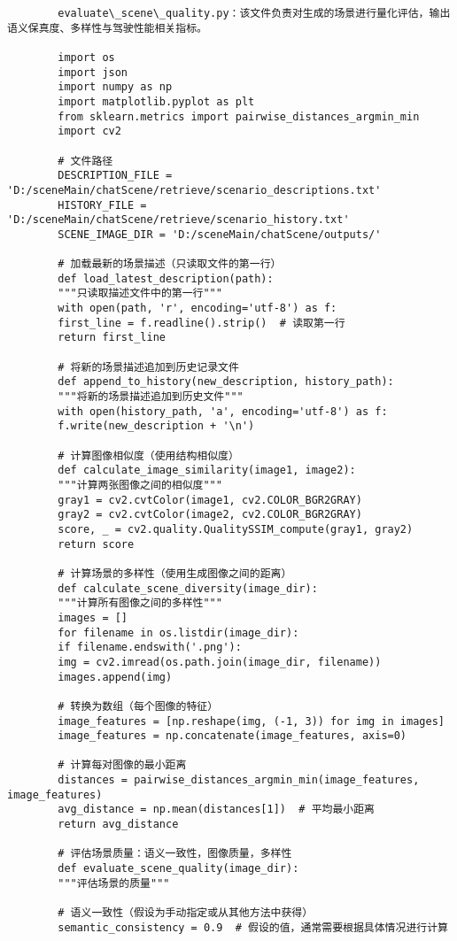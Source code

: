 	
\begin{lstlisting}
		evaluate\_scene\_quality.py：该文件负责对生成的场景进行量化评估，输出语义保真度、多样性与驾驶性能相关指标。

		import os
		import json
		import numpy as np
		import matplotlib.pyplot as plt
		from sklearn.metrics import pairwise_distances_argmin_min
		import cv2
		
		# 文件路径
		DESCRIPTION_FILE = 'D:/sceneMain/chatScene/retrieve/scenario_descriptions.txt'
		HISTORY_FILE = 'D:/sceneMain/chatScene/retrieve/scenario_history.txt'
		SCENE_IMAGE_DIR = 'D:/sceneMain/chatScene/outputs/'
		
		# 加载最新的场景描述（只读取文件的第一行）
		def load_latest_description(path):
		"""只读取描述文件中的第一行"""
		with open(path, 'r', encoding='utf-8') as f:
		first_line = f.readline().strip()  # 读取第一行
		return first_line
		
		# 将新的场景描述追加到历史记录文件
		def append_to_history(new_description, history_path):
		"""将新的场景描述追加到历史文件"""
		with open(history_path, 'a', encoding='utf-8') as f:
		f.write(new_description + '\n')
		
		# 计算图像相似度（使用结构相似度）
		def calculate_image_similarity(image1, image2):
		"""计算两张图像之间的相似度"""
		gray1 = cv2.cvtColor(image1, cv2.COLOR_BGR2GRAY)
		gray2 = cv2.cvtColor(image2, cv2.COLOR_BGR2GRAY)
		score, _ = cv2.quality.QualitySSIM_compute(gray1, gray2)
		return score
		
		# 计算场景的多样性（使用生成图像之间的距离）
		def calculate_scene_diversity(image_dir):
		"""计算所有图像之间的多样性"""
		images = []
		for filename in os.listdir(image_dir):
		if filename.endswith('.png'):
		img = cv2.imread(os.path.join(image_dir, filename))
		images.append(img)
		
		# 转换为数组（每个图像的特征）
		image_features = [np.reshape(img, (-1, 3)) for img in images]
		image_features = np.concatenate(image_features, axis=0)
		
		# 计算每对图像的最小距离
		distances = pairwise_distances_argmin_min(image_features, image_features)
		avg_distance = np.mean(distances[1])  # 平均最小距离
		return avg_distance
		
		# 评估场景质量：语义一致性，图像质量，多样性
		def evaluate_scene_quality(image_dir):
		"""评估场景的质量"""
		
		# 语义一致性（假设为手动指定或从其他方法中获得）
		semantic_consistency = 0.9  # 假设的值，通常需要根据具体情况进行计算
		

\end{lstlisting}
